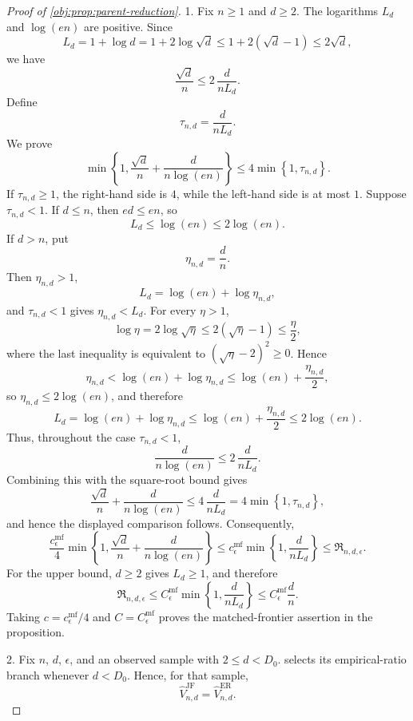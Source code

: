 \documentclass[11pt]{article}
\begin{document}
\begin{proof}[Proof of \cref{obj:prop:parent-reduction}]
1. Fix \(n\ge1\) and \(d\ge2\). The logarithms \(L_d\) and \(\log(en)\) are positive. Since
\[
L_d
=
1+\log d
=
1+2\log\sqrt d
\le
1+2(\sqrt d-1)
\le
2\sqrt d,
\]
we have
\[
\frac{\sqrt d}{n}
\le
2\,\frac{d}{nL_d}.
\]
Define
\[
\tau_{n,d}=\frac{d}{nL_d}.
\]
We prove
\[
\min\left\{1,\frac{\sqrt d}{n}+\frac{d}{n\log(en)}\right\}
\le
4\min\left\{1,\tau_{n,d}\right\}.
\]
If \(\tau_{n,d}\ge1\), the right-hand side is \(4\), while the left-hand side is at most \(1\).
Suppose \(\tau_{n,d}<1\). If \(d\le n\), then \(ed\le en\), so
\[
L_d\le \log(en)\le 2\log(en).
\]
If \(d>n\), put
\[
\eta_{n,d}=\frac dn .
\]
Then \(\eta_{n,d}>1\),
\[
L_d=\log(en)+\log\eta_{n,d},
\]
and \(\tau_{n,d}<1\) gives \(\eta_{n,d}<L_d\). For every \(\eta>1\),
\[
\log\eta
=
2\log\sqrt\eta
\le
2(\sqrt\eta-1)
\le
\frac{\eta}{2},
\]
where the last inequality is equivalent to \((\sqrt\eta-2)^2\ge0\). Hence
\[
\eta_{n,d}
<
\log(en)+\log\eta_{n,d}
\le
\log(en)+\frac{\eta_{n,d}}2,
\]
so \(\eta_{n,d}\le2\log(en)\), and therefore
\[
L_d
=
\log(en)+\log\eta_{n,d}
\le
\log(en)+\frac{\eta_{n,d}}2
\le
2\log(en).
\]
Thus, throughout the case \(\tau_{n,d}<1\),
\[
\frac{d}{n\log(en)}
\le
2\,\frac{d}{nL_d}.
\]
Combining this with the square-root bound gives
\[
\frac{\sqrt d}{n}+\frac{d}{n\log(en)}
\le
4\,\frac{d}{nL_d}
=
4\min\left\{1,\tau_{n,d}\right\},
\]
and hence the displayed comparison follows. Consequently,
\[
\frac{c_\epsilon^{\mathrm{mf}}}{4}
\min\left\{1,\frac{\sqrt d}{n}+\frac{d}{n\log(en)}\right\}
\le
c_\epsilon^{\mathrm{mf}}
\min\left\{1,\frac{d}{nL_d}\right\}
\le
\mathfrak R_{n,d,\epsilon}.
\]
For the upper bound, \(d\ge2\) gives \(L_d\ge1\), and therefore
\[
\mathfrak R_{n,d,\epsilon}
\le
C_\epsilon^{\mathrm{mf}}
\min\left\{1,\frac{d}{nL_d}\right\}
\le
C_\epsilon^{\mathrm{mf}}\frac dn .
\]
Taking \(c=c_\epsilon^{\mathrm{mf}}/4\) and \(C=C_\epsilon^{\mathrm{mf}}\) proves the matched-frontier assertion in the proposition. %

2. Fix \(n\), \(d\), \(\epsilon\), and an observed sample with \(2\le d<D_0\).  selects its empirical-ratio branch whenever \(d<D_0\). Hence, for that sample,
\[
\widehat V_{n,d}^{\mathrm{JF}}
=
\widehat V_{n,d}^{\mathrm{ER}} .
\]


\end{proof}
\end{document}
